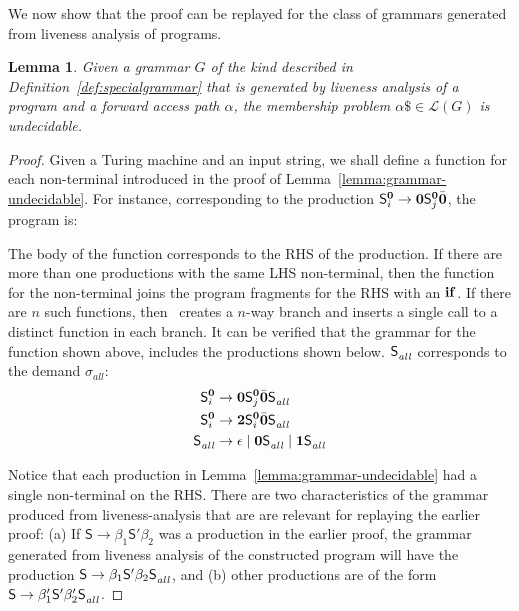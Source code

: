 \documentclass[9pt]{sigplanconf}
\newtheorem{lemma}[theorem]{Lemma}
\begin{document}
We now show that the proof can be replayed for the class of grammars
generated from liveness analysis of programs. 

\begin{lemma}\label{lemma:grammar-from-analysis-undecidable}
Given   a    grammar    $G$    of   the    kind    described    in
Definition~\ref{def:specialgrammar}  that  is  generated  by  liveness
analysis  of a  program  and  a forward  access  path $\alpha$,    the
membership problem $\alpha\$ \in \mathscr{L}(G)$ is undecidable.
\end{lemma} 

\begin{proof}
Given a Turing machine and an input string, we shall define a function
for   each  non-terminal   introduced  in   the  proof   of
Lemma~\ref{lemma:grammar-undecidable}.
For instance, corresponding to the production $\mathsf{S}_{i}^{\mathbf{0}} \rightarrow
\mathbf{0} \mathsf{S}_{j}^{\mathbf{0}}\bar{\mathbf{0}}$,
the program is:
 


The body of the function corresponds  to the RHS of the production. If
there are  more than one  productions with the same  LHS non-terminal,
then the function for the non-terminal joins the program fragments for
the  RHS  with an  $\mbox{$\mathbf{ if}$}$.   If  there  are  $n$ such  functions,  then
\mainpgm\ creates  a $n$-way  branch and  inserts a  single call  to a
distinct function in each branch. It  can be verified that the grammar
for      the     function      shown      above,     includes      the
productions shown below. $\mathsf{S}_{\mathit{all}}^{}$   corresponds   to  the   demand
$\sigma_{\mathit{all}}$:
\begin{align*}
\mathsf{S}_{i}^{\mathbf{0}} &\rightarrow \mathbf{0}\mathsf{S}_{j}^{\mathbf{0}}\bar{\mathbf{0}}\mathsf{S}_{\mathit{all}}^{} \\
\mathsf{S}_{i}^{\mathbf{0}} &\rightarrow {\mathbf{2}}\mathsf{S}_{i}^{\mathbf{0}}\bar{\mathbf{0}}\mathsf{S}_{\mathit{all}}^{} \\
\mathsf{S}_{\mathit{all}}^{} &\rightarrow \epsilon \mid \mathbf{0}\mathsf{S}_{\mathit{all}}^{} \mid
\mathbf{1}\mathsf{S}_{\mathit{all}}^{}
\end{align*}



Notice that  each production  in Lemma~\ref{lemma:grammar-undecidable}
had a single non-terminal on the RHS. There are two characteristics of
the grammar produced from liveness-analysis  that are are relevant for
replaying the  earlier proof:  (a) If $\mathsf{S}  \rightarrow \beta_1
\mathsf{S'}  \beta_2$  was a  production  in  the earlier  proof,  the
grammar  generated from  liveness  analysis of the constructed program
will  have the  production
$\mathsf{S}      \rightarrow      \beta_1     \mathsf{S'}      \beta_2
\mathsf{S}_{\mathit{\mathit{all}}}^{}$,  and (b)  other  productions are  of the  form
$\mathsf{S}       \rightarrow       \beta_1'\mathsf{S'}       \beta_2'
\mathsf{S}_{\mathit{all}}^{}$.


\end{proof}
\end{document}
